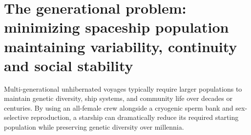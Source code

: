 \section{The generational problem: minimizing spaceship population maintaining variability, continuity and social stability}
\label{sec:the_generational_problem_minimizing_spaceship_population_maintaining_variability_continuity_and_social_stability}

Multi-generational unhibernated voyages typically require larger populations to maintain genetic diversity, ship systems, and community life over decades or centuries. By using an all-female crew alongside a cryogenic sperm bank and sex-selective reproduction, a starship can dramatically reduce its required starting population while preserving genetic diversity over millennia.
